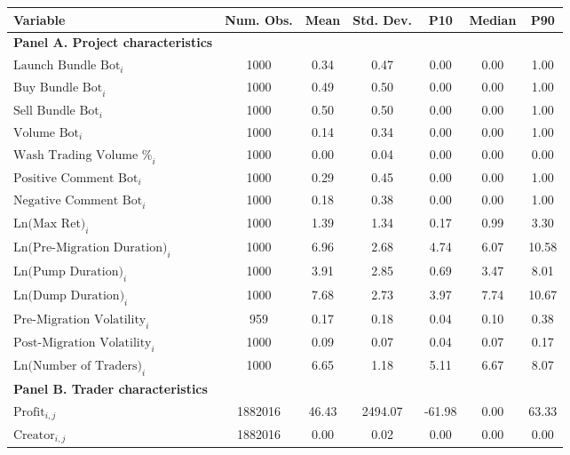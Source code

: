 \begin{tabular}{lcccccc}
\hline
Variable & Num. Obs. & Mean & Std. Dev. & P10 & Median & P90 \\
\hline
\textbf{Panel A. Project characteristics} \\
$\text{Launch Bundle Bot}_{i}$ & 1000 & 0.34 & 0.47 & 0.00 & 0.00 & 1.00 \\
$\text{Buy Bundle Bot}_{i}$ & 1000 & 0.49 & 0.50 & 0.00 & 0.00 & 1.00 \\
$\text{Sell Bundle Bot}_{i}$ & 1000 & 0.50 & 0.50 & 0.00 & 0.00 & 1.00 \\
$\text{Volume Bot}_{i}$ & 1000 & 0.14 & 0.34 & 0.00 & 0.00 & 1.00 \\
$\text{Wash Trading Volume \%}_{i}$ & 1000 & 0.00 & 0.04 & 0.00 & 0.00 & 0.00 \\
$\text{Positive Comment Bot}_{i}$ & 1000 & 0.29 & 0.45 & 0.00 & 0.00 & 1.00 \\
$\text{Negative Comment Bot}_{i}$ & 1000 & 0.18 & 0.38 & 0.00 & 0.00 & 1.00 \\
$\text{Ln(Max Ret)}_{i}$ & 1000 & 1.39 & 1.34 & 0.17 & 0.99 & 3.30 \\
$\text{Ln(Pre-Migration Duration)}_{i}$ & 1000 & 6.96 & 2.68 & 4.74 & 6.07 & 10.58 \\
$\text{Ln(Pump Duration)}_{i}$ & 1000 & 3.91 & 2.85 & 0.69 & 3.47 & 8.01 \\
$\text{Ln(Dump Duration)}_{i}$ & 1000 & 7.68 & 2.73 & 3.97 & 7.74 & 10.67 \\
$\text{Pre-Migration Volatility}_{i}$ & 959 & 0.17 & 0.18 & 0.04 & 0.10 & 0.38 \\
$\text{Post-Migration Volatility}_{i}$ & 1000 & 0.09 & 0.07 & 0.04 & 0.07 & 0.17 \\
$\text{Ln(Number of Traders)}_{i}$ & 1000 & 6.65 & 1.18 & 5.11 & 6.67 & 8.07 \\
\addlinespace
\textbf{Panel B. Trader characteristics} \\
$\text{Profit}_{i,j}$ & 1882016 & 46.43 & 2494.07 & -61.98 & 0.00 & 63.33 \\
$\text{Creator}_{i,j}$ & 1882016 & 0.00 & 0.02 & 0.00 & 0.00 & 0.00 \\
\hline
\end{tabular}